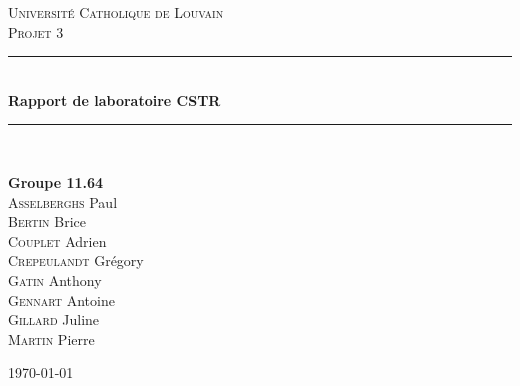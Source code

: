 \documentclass[a4paper,11pt]{article}
\begin{document}

\newcommand{\HRule}{\rule{\linewidth}{0.5mm}}

\fancyhf{} %
\fancyhead[R]{\thepage} %


\pagestyle{fancy}
\thispagestyle{empty}
\begin{titlepage}
\begin{center}


\textsc{\LARGE Université Catholique de Louvain}\\[1.5cm]

\textsc{\Large Projet 3}\\[0.5cm]

\HRule \\[0.4cm]
{ \huge \bfseries Rapport de laboratoire CSTR\\[0.4cm] }

\HRule \\[1.5cm]

\begin{minipage}{0.4\textwidth}
\begin{flushleft} \large
\textbf{Groupe \textsc{11.64}} \\
\textsc{Asselberghs} Paul \\
\textsc{Bertin} Brice \\
\textsc{Couplet} Adrien \\
\textsc{Crepeulandt} Grégory \\
\textsc{Gatin} Anthony \\
\textsc{Gennart} Antoine \\
\textsc{Gillard} Juline \\
\textsc{Martin} Pierre


\end{flushleft}
\end{minipage}
\begin{minipage}{0.4\textwidth}
\begin{flushright} \large
\end{flushright}
\end{minipage}

\setcounter{tocdepth}{2}
\tableofcontents %

\vfill

{\large \today}
\end{center}
\end{titlepage}
\clearpage
{}
\newpage
\end{document}

